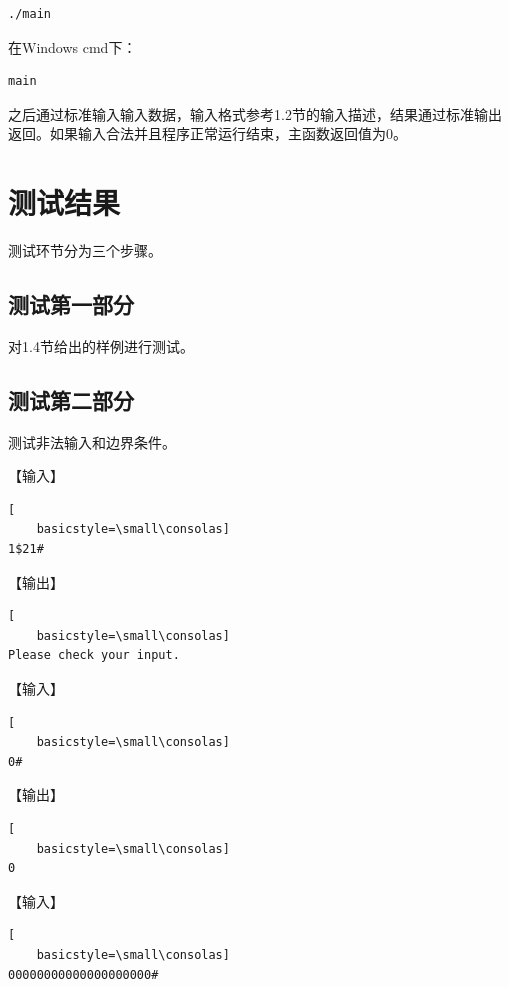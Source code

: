 \documentclass{article}
\begin{document}
\begin{lstlisting}[language={bash},
    basicstyle=\small\consolas]
./main
\end{lstlisting}

在Windows cmd下：

\begin{lstlisting}[language={bash},
    basicstyle=\small\consolas]
main
\end{lstlisting}

之后通过标准输入输入数据，输入格式参考1.2节的输入描述，结果通过标准输出返回。如果输入合法并且程序正常运行结束，主函数返回值为0。

\section{测试结果}

测试环节分为三个步骤。

\subsection{测试第一部分}

对1.4节给出的样例进行测试。

\subsection{测试第二部分}

测试非法输入和边界条件。

【输入】

\begin{lstlisting}[
    basicstyle=\small\consolas]
1$21#
\end{lstlisting}

【输出】

\begin{lstlisting}[
    basicstyle=\small\consolas]
Please check your input.
\end{lstlisting}

【输入】

\begin{lstlisting}[
    basicstyle=\small\consolas]
0#
\end{lstlisting}

【输出】

\begin{lstlisting}[
    basicstyle=\small\consolas]
0
\end{lstlisting}

【输入】

\begin{lstlisting}[
    basicstyle=\small\consolas]
00000000000000000000#
\end{lstlisting}
\end{document}

